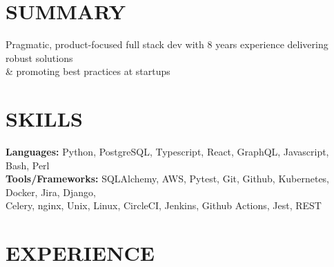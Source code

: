 \documentclass[]{resume}
\begin{document}
\begin{resume}
 \setlength{\sectionskip}{1.30em}
\section{SUMMARY\makebox[387 px]{\rule[.5 ex]{387 px}{1.0pt}}}
Pragmatic, product-focused full stack dev with 8 years experience delivering robust solutions \\
\& promoting best practices at startups
\section{SKILLS\makebox[416 px]{\rule[.5 ex]{416 px}{1.0pt}}}
\vspace{0.9mm}
\textbf{Languages:} \hspace*{13mm}Python, PostgreSQL, Typescript, React, GraphQL, Javascript, Bash, Perl \\
% 
\textbf{Tools/Frameworks:} SQLAlchemy, AWS, Pytest, Git, Github, Kubernetes, Docker, Jira, Django, \\
\hspace*{32mm}Celery, nginx, Unix, Linux, CircleCI, Jenkins, Github Actions, Jest, REST
\section{EXPERIENCE\makebox[372 px]{\rule[.5 ex]{372 px}{1.0pt}}}


\end{resume}
\end{document}
